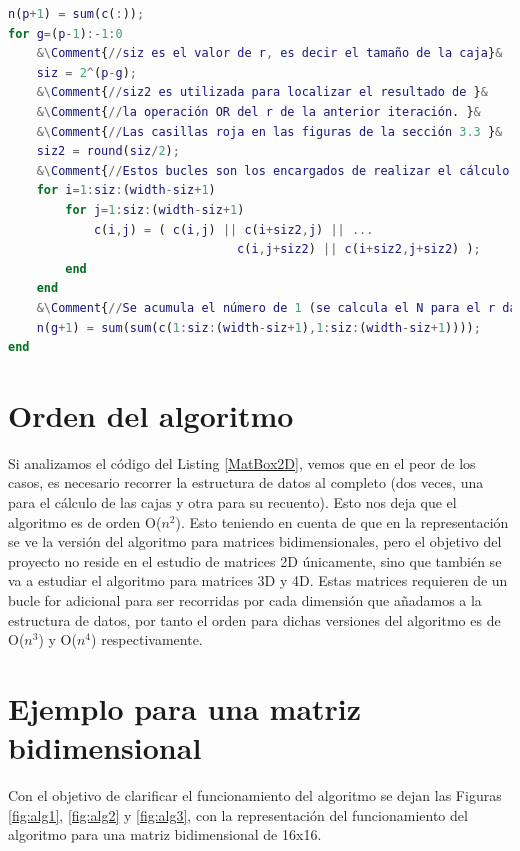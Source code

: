 \newpage
\begin{lstlisting}[language=Matlab,caption={Código Matlab del método Box counting para matrices bidimensionales. Las variables de entrada del código son la matriz c (matriz binaria que queremos analizar), la lista n (inicialmente vacía, contendrá el número de cajas válidas para cada tamaño de caja) y la variable p. que representa el número de iteraciones necesarias para cubrir la matriz entera, teniendo en cuenta que cada iteración aumenta el tamaño de la caja en una potencia de dos.\\},label=MatBox2D]
n(p+1) = sum(c(:));
for g=(p-1):-1:0
    &\Comment{//siz es el valor de r, es decir el tamaño de la caja}&
    siz = 2^(p-g);
    &\Comment{//siz2 es utilizada para localizar el resultado de }&
    &\Comment{//la operación OR del r de la anterior iteración. }&
    &\Comment{//Las casillas roja en las figuras de la sección 3.3 }&
    siz2 = round(siz/2);
    &\Comment{//Estos bucles son los encargados de realizar el cálculo del OR}&
    for i=1:siz:(width-siz+1)
        for j=1:siz:(width-siz+1)
            c(i,j) = ( c(i,j) || c(i+siz2,j) || ...
                                c(i,j+siz2) || c(i+siz2,j+siz2) );
        end
    end
    &\Comment{//Se acumula el número de 1 (se calcula el N para el r dado)}&
    n(g+1) = sum(sum(c(1:siz:(width-siz+1),1:siz:(width-siz+1))));
end
\end{lstlisting}

\section{Orden del algoritmo}
Si analizamos el código del Listing \ref{MatBox2D}, vemos que en el peor de los casos, es necesario recorrer la estructura de datos al completo (dos veces, una para el cálculo de las cajas y otra para su recuento). Esto nos deja que el algoritmo es de orden O($n^{2}$). Esto teniendo en cuenta de que en la representación se ve la versión del algoritmo para matrices bidimensionales, pero el objetivo del proyecto no reside en el estudio de matrices 2D únicamente, sino que también se va a estudiar el algoritmo para matrices 3D y 4D. Estas matrices requieren de un bucle for adicional para ser recorridas por cada dimensión que añadamos a la estructura de datos, por tanto el orden para dichas versiones del algoritmo es de O($n^{3}$) y O($n^{4}$) respectivamente.\\  


\section{Ejemplo para una matriz bidimensional}
Con el objetivo de clarificar el funcionamiento del algoritmo se dejan las Figuras \ref{fig:alg1}, \ref{fig:alg2} y \ref{fig:alg3}, con la representación del funcionamiento del algoritmo para una matriz bidimensional de 16x16.

